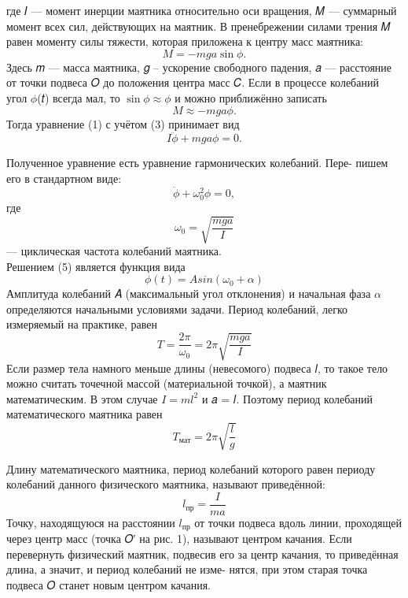 \documentclass[12pt]{article}
\begin{document}
    где 𝐼 — момент инерции маятника относительно оси вращения, 𝑀 —
    суммарный момент всех сил, действующих на маятник. В пренебрежении силами трения 𝑀 равен моменту силы тяжести, которая приложена к центру масс маятника: 
    \begin{equation}
       𝑀 = −𝑚g𝑎 \sin\phi.
    \end{equation}
    Здесь 𝑚 — масса маятника, 𝑔 – ускорение свободного падения, 𝑎 — расстояние от точки подвеса 𝑂 до положения центра масс 𝐶. Если в процессе колебаний угол $\phi$(𝑡) всегда мал, то $\sin\phi \approx \phi$ и можно приближённо записать
    \begin{equation}
       𝑀 \approx −𝑚g𝑎\phi.
    \end{equation}
    Тогда уравнение (1) с учётом (3) принимает вид
    \begin{equation}
        𝐼\ddot{\phi} + 𝑚g𝑎\phi = 0.
    \end{equation}
    
    Полученное уравнение есть уравнение гармонических колебаний. Пере-
    пишем его в стандартном виде:
    \begin{equation}
       \ddot{\phi} + \omega_0^2\phi = 0,
    \end{equation}
    где
    \begin{equation}
    \omega_0 = \sqrt{\frac{mga}{I}}
    \end{equation}
    — циклическая частота колебаний маятника. \\
    Решением (5) является функция вида
    \begin{equation}
    \phi(t) = Asin(\omega_0 + \alpha)
    \end{equation}
    Амплитуда колебаний 𝐴 (максимальный угол отклонения) и начальная
    фаза $\alpha$ определяются начальными условиями задачи. Период колебаний,
    легко измеряемый на практике, равен
    \begin{equation}
    T = \frac{2\pi}{\omega_0} = 2\pi\sqrt{\frac{mga}{I}}
    \end{equation}
    Если размер тела намного меньше длины (невесомого) подвеса 𝑙, то
    такое тело можно считать точечной массой (материальной точкой), а
    маятник математическим. В этом случае $𝐼 = 𝑚𝑙^2$ и 𝑎 = 𝑙. Поэтому
    период колебаний математического маятника равен
    \begin{equation}
    T_{мат} = 2\pi\sqrt{\frac{l}{g}}
    \end{equation}
    
    Длину математического маятника, период колебаний которого равен
    периоду колебаний данного физического маятника, называют приведённой:
    \begin{equation}
    l_{пр} = {\frac{I}{ma}}
    \end{equation}
    Точку, находящуюся на расстоянии $𝑙_{пр}$ от точки подвеса вдоль линии,
    проходящей через центр масс (точка 𝑂′ на рис. 1), называют центром
    качания. Если перевернуть физический маятник, подвесив его за центр
    качания, то приведённая длина, а значит, и период колебаний не изме-
    нятся, при этом старая точка подвеса 𝑂 станет новым центром качания.
    
\end{document}
